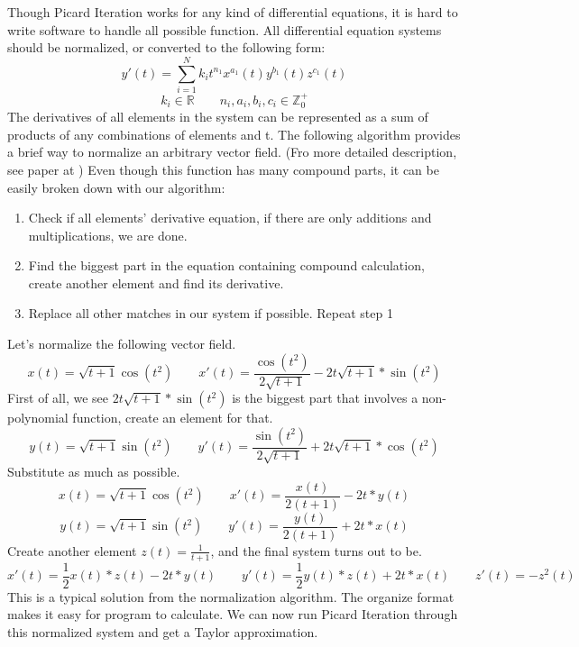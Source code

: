 \documentclass[12pt]{article}
\begin{document}
Though Picard Iteration works for any kind of differential equations, it is hard to write software to handle all possible function. All differential equation systems should be normalized, or converted to the following form:
$$
y'(t) = \sum^N_{i=1} k_{i} t^{n_{1}} x^{a_{1}}(t) y^{b_{1}}(t) z^{c_{1}}(t) 
$$
$$
k_i \in \mathbb{R} \qquad n_i, a_i, b_i, c_i \in \mathbb{Z}^+_0
$$
The derivatives of all elements in the system can be represented as a sum of products of any combinations of elements and t. The following algorithm provides a brief way to normalize an arbitrary vector field. (Fro more detailed description, see paper at \cite{NORMAL})
Even though this function has many compound parts, it can be easily broken down with our algorithm:
\begin{enumerate}
\item Check if all elements' derivative equation, if there are only additions and multiplications, we are done.
\item Find the biggest part in the equation containing compound calculation, create another element and find its derivative.
\item Replace all other matches in our system if possible. Repeat step 1
\end{enumerate}
Let's normalize the following vector field.
\begin{equation}
x(t) = \sqrt{t+1}\cos(t^2)  \qquad
x'(t) = \frac{\cos(t^2)}{2\sqrt{t+1}} - 2t\sqrt{t+1}*\sin(t^2)
\end{equation}
First of all, we see $2t\sqrt{t+1}*\sin(t^2)$ is the biggest part that involves a non-polynomial function, create an element for that. 
\begin{equation}
y(t) = \sqrt{t+1}\sin(t^2)  \qquad
y'(t) = \frac{\sin(t^2)}{2\sqrt{t+1}} + 2t\sqrt{t+1}*\cos(t^2)
\end{equation}
Substitute as much as possible.
\begin{equation}
x(t) = \sqrt{t+1}\cos(t^2)  \qquad
x'(t) = \frac{x(t)}{2(t+1)} - 2t*y(t)
\end{equation}
\begin{equation}
y(t) = \sqrt{t+1}\sin(t^2)  \qquad
y'(t) = \frac{y(t)}{2(t+1)} + 2t*x(t)
\end{equation}
Create another element $z(t) = \frac{1}{t+1}$, and the final system turns out to be.
\begin{equation}
x'(t) = \frac{1}{2}x(t)*z(t) - 2t*y(t) \qquad
y'(t) = \frac{1}{2}y(t)*z(t) + 2t*x(t) \qquad
z'(t) = -z^{2}(t)
\end{equation}
This is a typical solution from the normalization algorithm. The organize format makes it easy for program to calculate. We can now run Picard Iteration through this normalized system and get a Taylor approximation.
\end{document}
